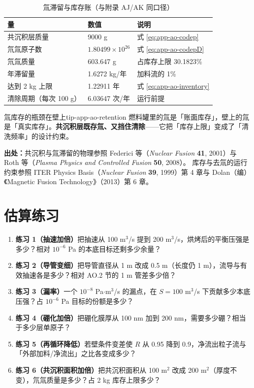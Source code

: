 \begin{table}[htbp]
\centering
\caption{氚滞留与库存账（与附录 AJ/AK 同口径）}
\label{tab:app-ao-retention}
{\small
\begin{tabular}{p{4.8cm}p{3.6cm}p{6.2cm}}
\toprule
量 & 数值 & 说明 \\
\midrule
共沉积层质量 & 9000 g & 式 \eqref{eq:app-ao-codep} \\
氘氚原子数 & $1.80499\times10^{26}$ & 式 \eqref{eq:app-ao-codepD} \\
氘氚质量 & 603.647 g & 占库存上限 30.1823\% \\
年滞留量 & 1.6272 kg/年 & 加料流的 1\% \\
达到 2 kg 上限 & 1.22911 年 & 式 \eqref{eq:app-ao-inventory} \\
清除周期（每次 100 g） & 6.03647 次/年 & 运行前提 \\
\bottomrule
\end{tabular}}
\end{table}

\begin{tip}{氚库存的瓶颈在壁上}{tip-app-ao-retention}
燃料罐里的氚是「账面库存」，壁上的氚是「真实库存」。\textbf{共沉积层既存氚、又挡住清除}——它把「库存上限」变成了「清洗频率」的设计约束。
\end{tip}

{\small

\textbf{出处：}共沉积与氚滞留的物理参照 Federici 等（\textit{Nuclear Fusion} \textbf{41}, 2001）与 Roth 等（\textit{Plasma Physics and Controlled Fusion} \textbf{50}, 2008）。
库存与去氚的运行约束参照 ITER Physics Basis（\textit{Nuclear Fusion} \textbf{39}, 1999）第 4 章与 Dolan（编）《Magnetic Fusion Technology》（2013）第 6 章。
\section{估算练习}
\label{sec:app-ao-problems}
}

\begin{enumerate}
\item \textbf{练习 1（抽速加倍）}把抽速从 100 m$^3$/s 提到 200 m$^3$/s，烘烤后的平衡压强是多少？相对 $10^{-6}$ Pa 的本底目标还剩多少余量？
\item \textbf{练习 2（导管变细）}把导管直径从 1 m 改成 0.5 m（长度仍 1 m），流导与有效抽速各是多少？相对 AO.2 节的 1 m 管差多少倍？
\item \textbf{练习 3（漏率）}一个 $10^{-8}$ Pa$\cdot$m$^3$/s 的漏点，在 $S=100$ m$^3$/s 下贡献多少本底压强？占 $10^{-6}$ Pa 目标的份额是多少？
\item \textbf{练习 4（硼化加倍）}把硼化膜厚从 100 nm 加到 200 nm，需要多少硼？相当于多少层单原子？
\item \textbf{练习 5（再循环降低）}若壁条件变差使 $R$ 从 0.95 降到 0.9，净流出粒子流与「外部加料/净流出」之比各变成多少？
\item \textbf{练习 6（共沉积面积加倍）}把共沉积面积从 100 m$^2$ 改成 200 m$^2$（厚度不变），氘氚质量是多少？占 2 kg 库存上限多少？
\end{enumerate}

